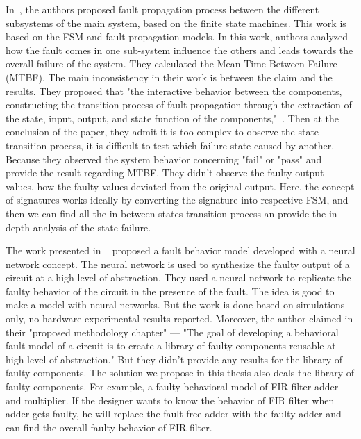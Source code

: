 In~\citep{chen2017fault}, the authors proposed fault propagation process between the different subsystems of the
main system, based on the finite state machines. This work is based on the FSM and fault propagation models. In this work, authors analyzed how the fault comes in one sub-system influence the others and leads towards the overall failure of the system. They calculated the Mean Time Between Failure (MTBF). The main inconsistency in their work is between the claim and the results. They proposed that "the interactive behavior between the components, constructing the transition process of fault propagation through the extraction of the state, input, output, and state function of the components,"~\citep{chen2017fault}. Then at the conclusion of the paper, they admit it is too complex to observe the state transition process, it is difficult to test which failure state caused by another. Because they observed the system behavior concerning "fail" or "pass"  and provide the result regarding  MTBF. They didn't observe the faulty output values, how the faulty values deviated from the original output. Here, the concept of signatures works ideally by converting the signature into respective FSM, and then we can find all the in-between states transition process an provide the in-depth analysis of the state failure.  


The work presented in ~\citep{mirzadeh2014modeling} proposed a fault behavior model developed with a neural network
concept. The neural network is used to synthesize the faulty output of a
circuit at a high-level of abstraction. They used a neural network to replicate the faulty behavior of the circuit in the presence of the fault. The idea is good to make a model with neural networks. But the work is done based on simulations only, no hardware experimental results reported. Moreover, the author claimed in their "proposed methodology chapter"  --- "The goal of developing a behavioral fault model of a circuit is to create a library of faulty components reusable at high-level of abstraction." But they didn't provide any results for the library of faulty components. The solution we propose in this thesis also deals the library of faulty components. For example, a faulty behavioral model of FIR filter adder and multiplier. If the designer wants to know the behavior of FIR filter when adder gets faulty, he will replace the fault-free adder with the faulty adder and can find the overall faulty behavior of FIR filter.


